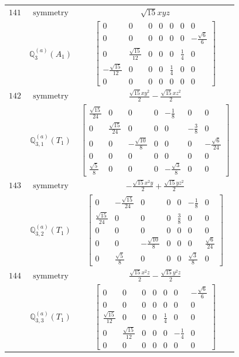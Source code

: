 \documentclass[fleqn,8pt,landscape]{jsarticle}
\begin{document}
\begin{longtable}{ccc}
$ 141 $ & $ \text{symmetry} $ & $ \sqrt{15} x y z $ \\
$  $ & $ \mathbb{Q}_{3}^{(a)}(A_{1}) $ & $ \begin{bmatrix} 0 & 0 & 0 & 0 & 0 & 0 & 0 \\ 0 & 0 & 0 & 0 & 0 & 0 & - \frac{\sqrt{6}}{6} \\ 0 & \frac{\sqrt{15}}{12} & 0 & 0 & 0 & \frac{1}{4} & 0 \\ - \frac{\sqrt{15}}{12} & 0 & 0 & 0 & \frac{1}{4} & 0 & 0 \\ 0 & 0 & 0 & 0 & 0 & 0 & 0 \end{bmatrix} $ \\ \hline
$ 142 $ & $ \text{symmetry} $ & $ \frac{\sqrt{15} x y^{2}}{2} - \frac{\sqrt{15} x z^{2}}{2} $ \\
$  $ & $ \mathbb{Q}_{3,1}^{(a)}(T_{1}) $ & $ \begin{bmatrix} \frac{\sqrt{15}}{24} & 0 & 0 & 0 & - \frac{1}{8} & 0 & 0 \\ 0 & \frac{\sqrt{15}}{24} & 0 & 0 & 0 & - \frac{3}{8} & 0 \\ 0 & 0 & - \frac{\sqrt{10}}{8} & 0 & 0 & 0 & - \frac{\sqrt{6}}{24} \\ 0 & 0 & 0 & 0 & 0 & 0 & 0 \\ \frac{\sqrt{5}}{8} & 0 & 0 & 0 & - \frac{\sqrt{3}}{8} & 0 & 0 \end{bmatrix} $ \\ \hline
$ 143 $ & $ \text{symmetry} $ & $ - \frac{\sqrt{15} x^{2} y}{2} + \frac{\sqrt{15} y z^{2}}{2} $ \\
$  $ & $ \mathbb{Q}_{3,2}^{(a)}(T_{1}) $ & $ \begin{bmatrix} 0 & - \frac{\sqrt{15}}{24} & 0 & 0 & 0 & - \frac{1}{8} & 0 \\ \frac{\sqrt{15}}{24} & 0 & 0 & 0 & \frac{3}{8} & 0 & 0 \\ 0 & 0 & 0 & 0 & 0 & 0 & 0 \\ 0 & 0 & - \frac{\sqrt{10}}{8} & 0 & 0 & 0 & \frac{\sqrt{6}}{24} \\ 0 & \frac{\sqrt{5}}{8} & 0 & 0 & 0 & \frac{\sqrt{3}}{8} & 0 \end{bmatrix} $ \\ \hline
$ 144 $ & $ \text{symmetry} $ & $ \frac{\sqrt{15} x^{2} z}{2} - \frac{\sqrt{15} y^{2} z}{2} $ \\
$  $ & $ \mathbb{Q}_{3,3}^{(a)}(T_{1}) $ & $ \begin{bmatrix} 0 & 0 & 0 & 0 & 0 & 0 & - \frac{\sqrt{6}}{6} \\ 0 & 0 & 0 & 0 & 0 & 0 & 0 \\ \frac{\sqrt{15}}{12} & 0 & 0 & 0 & \frac{1}{4} & 0 & 0 \\ 0 & \frac{\sqrt{15}}{12} & 0 & 0 & 0 & - \frac{1}{4} & 0 \\ 0 & 0 & 0 & 0 & 0 & 0 & 0 \end{bmatrix} $ \\ \hline

\end{longtable}
\end{document}
